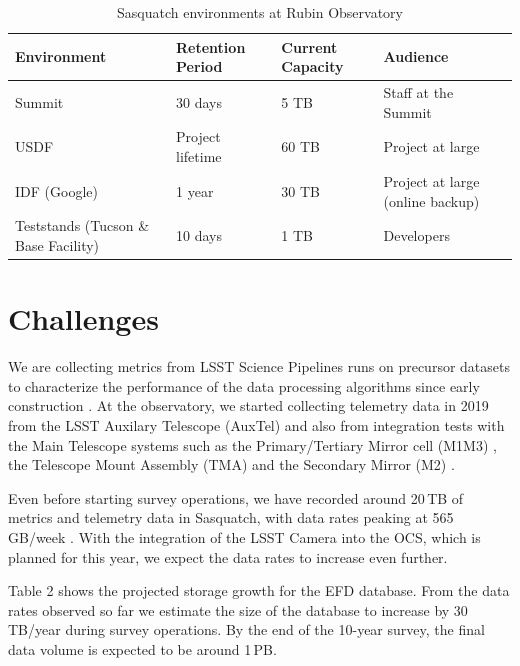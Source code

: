 \begin{table}[ht]
    \small
    \centering
    \caption{Sasquatch environments at Rubin Observatory}
    \begin{tabular}{@{}llll@{}}
        \toprule
        \textbf{Environment} & \textbf{Retention Period} & \textbf{Current Capacity} & \textbf{Audience} \\
        \midrule
        Summit & 30 days & 5 TB & Staff at the Summit \\
        USDF & Project lifetime & 60 TB & Project at large \\
        IDF (Google) & 1 year & 30 TB & Project at large (online backup) \\
        Teststands (Tucson \& Base Facility) & 10 days & 1 TB & Developers \\
        \bottomrule
    \end{tabular}
\end{table}

\section{Challenges}
\label{sec:challenges}

We are collecting metrics from LSST Science Pipelines runs on precursor datasets to characterize the performance of the data processing algorithms since early construction \cite{DMTN-091,2022SPIE12189E..0MG}. At the observatory, we started collecting telemetry data in 2019 from the LSST Auxilary Telescope (AuxTel) and also from integration tests with the Main Telescope systems such as the Primary/Tertiary Mirror cell (M1M3) \cite{SITCOMTN-088}, the Telescope Mount Assembly (TMA) \cite{SITCOMTN-121} and the Secondary Mirror (M2) \cite{SITCOMTN-120}.

Even before starting survey operations, we have recorded around 20\,TB of metrics and telemetry data in Sasquatch, with data rates peaking at 565\,GB/week \cite{SQR-085}. With the integration of the LSST Camera into the OCS, which is planned for this year, we expect the data rates to increase even further.

Table 2 shows the projected storage growth for the EFD database. From the data rates observed so far we estimate the size of the database to increase by 30\,TB/year during survey operations. By the end of the 10-year survey, the final data volume is expected to be around 1\,PB.


